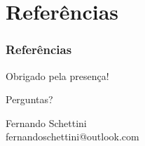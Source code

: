 \documentclass{beamer}
\begin{document}
\section{Referências}

\begin{frame}[allowframebreaks]
\frametitle{Referências}
\nocite{*}
\printbibliography
\end{frame}


\begin{frame}
\Large{\centerline{Obrigado pela presença!}}
\Large{\centerline{Perguntas?}}

\vspace{0.5cm}

\centering
{\small Fernando Schettini \\ \color{blue}fernandoschettini@outlook.com}

\end{frame}
\end{document}
